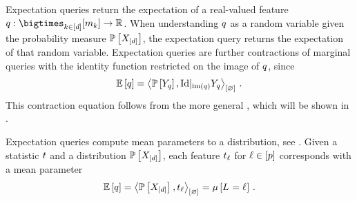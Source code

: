 Expectation queries return the expectation of a real-valued feature $\exfunction : \facstates\rightarrow\rr$.
When understanding $q$ as a random variable given the probability measure $\mathbb{P}\left[X_{[d]}\right]$, the expectation query returns the expectation of that random variable.
Expectation queries are further contractions of marginal queries with the identity function restricted on the image of $q$, since
\begin{align*}
    \mathbb{E}\left[q\right]
    = \left\langle \mathbb{P}\left[Y_{q}\right],{\mathrm{Id}}|_{\mathrm{im}\left(q\right)}{Y_{q}} \right\rangle_{\left[ \varnothing \right]} \, .
\end{align*}
This contraction equation follows from the more general , which will be shown in .

Expectation queries compute mean parameters to a distribution, see .
Given a statistic $t$ and a distribution $\mathbb{P}\left[X_{[d]}\right]$, each feature $t_{\ell}$ for $\ell\in[p]$ corresponds with a mean parameter
\begin{align*}
    \mathbb{E}\left[q\right] = \left\langle \mathbb{P}\left[X_{[d]}\right],t_{\ell}\right\rangle_{\left[ \varnothing \right]} = \mu\left[L_{}=\ell_{}\right] \, .
\end{align*}



